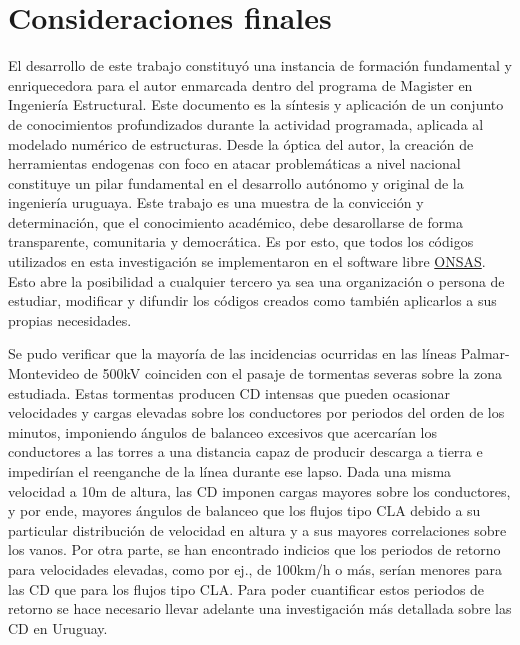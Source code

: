 \chapter{Consideraciones finales}\label{Cap:Conlcusiones}
\linenumbers

El desarrollo de este trabajo constituyó una instancia de formación fundamental y enriquecedora para el autor enmarcada dentro del programa de Magister en Ingeniería Estructural. Este documento es la síntesis y aplicación de un conjunto de conocimientos profundizados durante la actividad programada, aplicada al modelado numérico de estructuras. Desde la óptica del autor, la creación de herramientas endogenas con foco en atacar problemáticas a nivel nacional constituye un pilar fundamental en el desarrollo autónomo y original de la ingeniería uruguaya. Este trabajo es una muestra de la convicción y determinación, que el conocimiento académico, debe desarollarse de forma transparente, comunitaria y democrática. Es por esto, que todos los códigos utilizados en esta investigación se implementaron en el software libre \href{https://github.com/ONSAS/ONSAS/}{ONSAS}. Esto abre la posibilidad a cualquier tercero ya sea una organización o persona de estudiar, modificar y difundir los códigos creados como también aplicarlos a sus propias necesidades. 



Se pudo verificar que la mayoría de las incidencias ocurridas en las líneas Palmar-Montevideo de 500kV coinciden con el pasaje de tormentas severas sobre la zona estudiada. Estas tormentas producen CD intensas que pueden ocasionar velocidades y cargas elevadas sobre los conductores por periodos del orden de los minutos, imponiendo ángulos de balanceo excesivos que acercarían los conductores a las torres a una distancia capaz de producir descarga a tierra e impedirían el reenganche de la línea durante ese lapso.
Dada una misma velocidad a 10m de altura, las CD imponen cargas mayores sobre los conductores, y por ende, mayores ángulos de balanceo que los flujos tipo CLA debido a su particular distribución de velocidad en altura y a sus mayores correlaciones sobre los vanos. Por otra parte, se han encontrado indicios que los periodos de retorno para velocidades elevadas, como por ej., de 100km/h o más, serían menores para las CD que para los flujos tipo CLA. Para poder cuantificar estos periodos de retorno se hace necesario llevar adelante una investigación más detallada sobre las CD en Uruguay.

